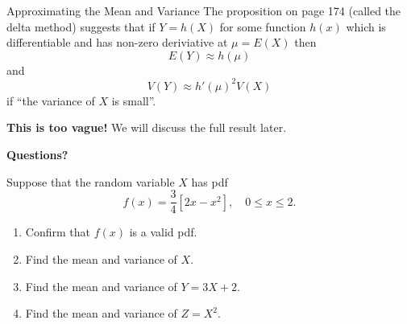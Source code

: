 \begin{frame}
  \begin{block}{Approximating the Mean and Variance}
    The proposition on page 174 (called the delta method) suggests that if $Y=h(X)$ for some function $h(x)$ which is differentiable and has non-zero deriviative at $\mu=E(X)$ then
\[
E(Y)\approx h(\mu)
\]
and
\[
V(Y)\approx h'(\mu)^2 V(X)
\]
if ``the variance of $X$ is small''.

\bigskip

\begin{center}
  \textbf{This is too vague!}
  We will discuss the full result later.
\end{center}
  \end{block}
\end{frame}

\begin{frame}
  \begin{center}
    \Large{\textbf{Questions?}}
  \end{center}
\end{frame}

\begin{frame}

\begin{block}{\exercise}
Suppose that the random variable $X$ has pdf
$$
f(x)=\frac{3}{4}\left[2x-x^2\right],\quad 0 \leq x \leq 2.
$$

\begin{enumerate}[label=\alph*),start=1]
\item Confirm that $f(x)$ is a valid pdf.
\item Find the mean and variance of $X$.
\item Find the mean and variance of $Y=3X+2$.
\item Find the mean and variance of $Z=X^2$.
\end{enumerate}
\end{block}
\end{frame}


